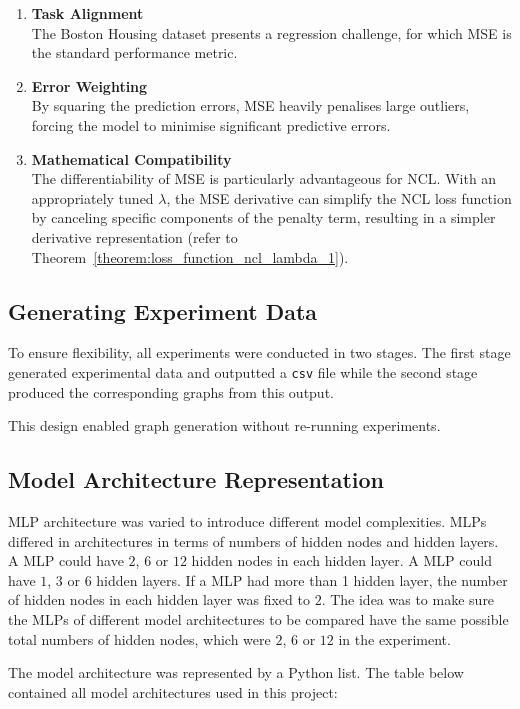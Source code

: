 \documentclass{article}
\begin{document}
\begin{enumerate}
    \item \textbf{Task Alignment} \\
    The Boston Housing dataset presents a regression challenge, for which MSE is the standard performance metric. 

    \item \textbf{Error Weighting} \\
    By squaring the prediction errors, MSE heavily penalises large outliers, forcing the model to minimise significant predictive errors. 

    \item \textbf{Mathematical Compatibility} \\
    The differentiability of MSE is particularly advantageous for NCL. With an appropriately tuned $\lambda$, the MSE derivative can simplify the NCL loss function by canceling specific components of the penalty term, resulting in a simpler derivative representation (refer to Theorem~\ref{theorem:loss_function_ncl_lambda_1}). 
\end{enumerate}


\subsection{Generating Experiment Data}
To ensure flexibility, all experiments were conducted in two stages. The first stage generated experimental data and outputted a \texttt{csv} file while the second stage produced the corresponding graphs from this output. 

This design enabled graph generation without re-running experiments. 


\subsection{Model Architecture Representation}
MLP architecture was varied to introduce different model complexities. MLPs differed in architectures in terms of numbers of hidden nodes and hidden layers. A MLP could have $2$, $6$ or $12$ hidden nodes in each hidden layer. A MLP could have $1$, $3$ or $6$ hidden layers. If a MLP had more than 1 hidden layer, the number of hidden nodes in each hidden layer was fixed to $2$. The idea was to make sure the MLPs of different model architectures to be compared have the same possible total numbers of hidden nodes, which were $2$, $6$ or $12$ in the experiment. 

The model architecture was represented by a Python list. The table below contained all model architectures used in this project: 
\end{document}
